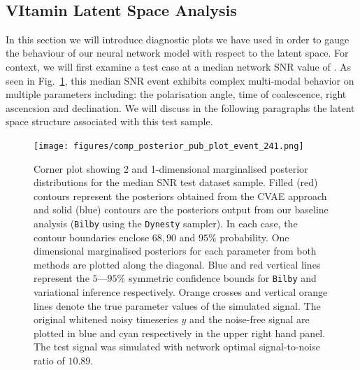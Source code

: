 ~


\subsection{VItamin Latent Space Analysis}
%
%
In this section we will introduce diagnostic plots we have used in order to gauge the behaviour of our neural network model with respect to the latent space.
%
%
For context, we will first examine a test case at a median network 
\ac{SNR} value of . As seen in Fig.~\ref{fig:comp_post_0}, this 
median \ac{SNR} event exhibits complex multi-modal behavior on multiple 
parameters including: the polarisation angle, time of coalescence, right 
ascencsion and declination. We will discuss in the following paragraphs the 
latent space structure associated with this test sample.

%
%
\begin{figure}
    \texttt{[image: figures/comp\_posterior\_pub\_plot\_event\_241.png]}
    \caption[Posterior predictions from \texttt{VItamin}, \texttt{Dynesty} and \texttt{Ptemcee} for the median SNR test sample case in the \texttt{VItamin} paper training set.]{\label{fig:comp_post_0} Corner plot showing 2 and 1-dimensional marginalised posterior distributions for the median \ac{SNR} test dataset sample. Filled (red) contours represent the posteriors obtained from the \ac{CVAE} approach and solid (blue) contours are the posteriors output from our baseline analysis (\texttt{Bilby} using the \texttt{Dynesty} sampler). In each case, the contour boundaries enclose $68,90$ and $95\%$ probability. One dimensional marginalised posteriors for each parameter from both methods are plotted along the diagonal. Blue and red vertical lines represent the $5$---$95\%$ symmetric confidence bounds for \texttt{Bilby} and variational inference respectively. Orange crosses and vertical orange lines denote the true parameter values of the simulated signal. The original whitened noisy timeseries $y$ and the noise-free signal are plotted in blue and cyan respectively in the upper right hand panel. The test signal was simulated with network optimal signal-to-noise ratio of $10.89$.}
\end{figure}

